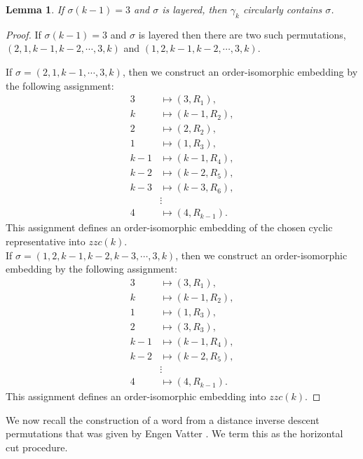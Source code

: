 \documentclass[a4paper,12pt]{article}
\newtheorem{lemma}[theorem]{Lemma}
\theoremstyle{definition}
\numberwithin{equation}{section}
\begin{document}
\begin{lemma}\label{layerd3}
    If $\sigma(k-1) = 3$ and $\sigma$ is layered, then $\gamma_k$ circularly contains $\sigma$.
\end{lemma}
\begin{proof}
    If $\sigma(k-1) = 3$ and $\sigma$ is layered then there are two such permutations, $(2,1,k-1,k-2,\cdots,3,k)$ and $(1,2,k-1,k-2,\cdots,3,k)$. \par
    If $\sigma=(2,1,k-1,\cdots,3,k)$, then we construct an order-isomorphic embedding by the following assignment:
\begin{align*}
3      &\mapsto (3,R_1),\\
k      &\mapsto (k-1,R_2),\\
2      &\mapsto (2,R_2),\\
1      &\mapsto (1,R_3),\\
k-1    &\mapsto (k-1,R_4),\\
k-2    &\mapsto (k-2,R_5),\\
k-3    &\mapsto (k-3,R_6),\\
&\vdots\\
4      &\mapsto (4,R_{k-1}).
\end{align*}
This assignment defines an order-isomorphic embedding of the chosen cyclic representative into $zzc(k)$. \\

If $\sigma=(1,2,k-1,k-2,k-3,\cdots,3,k)$, then we construct an order-isomorphic embedding by the following assignment:
\begin{align*}
3      &\mapsto (3,R_1),\\
k      &\mapsto (k-1,R_2),\\
1      &\mapsto (1,R_3),\\
2      &\mapsto (3,R_3),\\
k-1    &\mapsto (k-1,R_4),\\
k-2    &\mapsto (k-2,R_5),\\
&\vdots\\
4      &\mapsto (4,R_{k-1}).
\end{align*}
This assignment defines an order-isomorphic embedding into $zzc(k)$.
\end{proof}

We now recall the construction of a word from a distance inverse descent permutations that was given by Engen Vatter \cite{engen2020containing}. We term this as the horizontal cut procedure.
\end{document}
